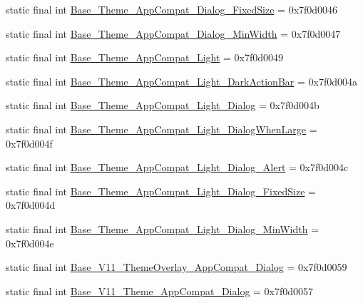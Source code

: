 \begin{DoxyCompactItemize}
\item 
static final int \mbox{\hyperlink{classandroid_1_1support_1_1design_1_1R_1_1style_abb3e972d5a6c0584b50249b06d8480be}{Base\+\_\+\+Theme\+\_\+\+App\+Compat\+\_\+\+Dialog\+\_\+\+Fixed\+Size}} = 0x7f0d0046
\item 
static final int \mbox{\hyperlink{classandroid_1_1support_1_1design_1_1R_1_1style_aac1d079153dc508f7d8f6b0c2469e8a3}{Base\+\_\+\+Theme\+\_\+\+App\+Compat\+\_\+\+Dialog\+\_\+\+Min\+Width}} = 0x7f0d0047
\item 
static final int \mbox{\hyperlink{classandroid_1_1support_1_1design_1_1R_1_1style_aec318d3a8e9ecefd9031f08ae588d966}{Base\+\_\+\+Theme\+\_\+\+App\+Compat\+\_\+\+Light}} = 0x7f0d0049
\item 
static final int \mbox{\hyperlink{classandroid_1_1support_1_1design_1_1R_1_1style_a9ddf73b77f2f311699b8f3b865849ef2}{Base\+\_\+\+Theme\+\_\+\+App\+Compat\+\_\+\+Light\+\_\+\+Dark\+Action\+Bar}} = 0x7f0d004a
\item 
static final int \mbox{\hyperlink{classandroid_1_1support_1_1design_1_1R_1_1style_af5d45129d3e4af93a8217238dfafaf78}{Base\+\_\+\+Theme\+\_\+\+App\+Compat\+\_\+\+Light\+\_\+\+Dialog}} = 0x7f0d004b
\item 
static final int \mbox{\hyperlink{classandroid_1_1support_1_1design_1_1R_1_1style_a0ad4907d451d72d762746efffaf2eb0a}{Base\+\_\+\+Theme\+\_\+\+App\+Compat\+\_\+\+Light\+\_\+\+Dialog\+When\+Large}} = 0x7f0d004f
\item 
static final int \mbox{\hyperlink{classandroid_1_1support_1_1design_1_1R_1_1style_ab4c97086018fdcb13c697486f0bc95d9}{Base\+\_\+\+Theme\+\_\+\+App\+Compat\+\_\+\+Light\+\_\+\+Dialog\+\_\+\+Alert}} = 0x7f0d004c
\item 
static final int \mbox{\hyperlink{classandroid_1_1support_1_1design_1_1R_1_1style_a226a2a22f1ac3a745bc2564cd99de646}{Base\+\_\+\+Theme\+\_\+\+App\+Compat\+\_\+\+Light\+\_\+\+Dialog\+\_\+\+Fixed\+Size}} = 0x7f0d004d
\item 
static final int \mbox{\hyperlink{classandroid_1_1support_1_1design_1_1R_1_1style_af0527dd1a67e7b9b0a12f3aee871151a}{Base\+\_\+\+Theme\+\_\+\+App\+Compat\+\_\+\+Light\+\_\+\+Dialog\+\_\+\+Min\+Width}} = 0x7f0d004e
\item 
static final int \mbox{\hyperlink{classandroid_1_1support_1_1design_1_1R_1_1style_abfc7004cdb5a2315ae216511f45d71b1}{Base\+\_\+\+V11\+\_\+\+Theme\+Overlay\+\_\+\+App\+Compat\+\_\+\+Dialog}} = 0x7f0d0059
\item 
static final int \mbox{\hyperlink{classandroid_1_1support_1_1design_1_1R_1_1style_a43e7623f508a10b44e65d66db7435b9e}{Base\+\_\+\+V11\+\_\+\+Theme\+\_\+\+App\+Compat\+\_\+\+Dialog}} = 0x7f0d0057

\end{DoxyCompactItemize}
